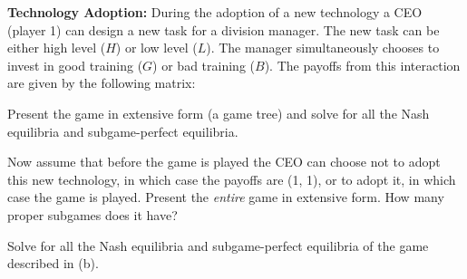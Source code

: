 
\textbf{Technology Adoption:} During the adoption of a new technology a CEO (player 1) can
design a new task for a division manager. The new task can be either high level ($H$) or low level
($L$). The manager simultaneously chooses to invest in good training ($G$) or bad training ($B$).
The payoffs from this interaction are given by the following matrix:
\begin{partes}
\item Present the game in extensive form (a game tree) and solve for all the Nash equilibria and
subgame-perfect equilibria.
\item Now assume that before the game is played the CEO can choose not to adopt this new technology,
in which case the payoffs are (1, 1), or to adopt it, in which case the game is played. Present the
\emph{entire} game in extensive form. How many proper subgames does it have?
\item Solve for all the Nash equilibria and subgame-perfect equilibria of the game described in (b).
\end{partes}
\resolespaco



